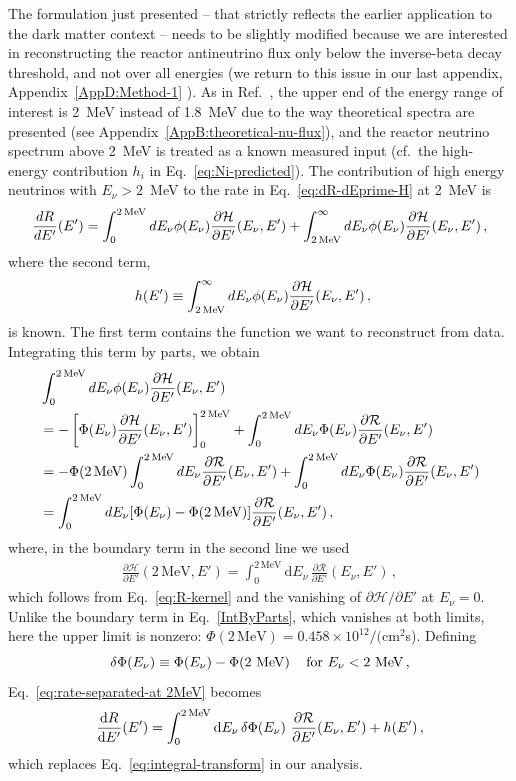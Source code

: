 \documentclass[a4paper,11pt]{article}
\renewcommand\({\left(}
\renewcommand\){\right)}
\renewcommand\[{\left[}
\renewcommand\]{\right]}
\newcommand{\df}{\text{d}}
\newcommand{\al}[1]{\begin{align}#1\end{align}}
\newcommand{\paren}[1]{\left(#1\right)}
\newcommand{\fn}[1]{\!\paren{#1}} %
\newcommand{\nn}{\nonumber\\}
\newcommand{\p}{\partial}
\newcommand{\GG}[1]{{\color[cmyk]{1,0.5,0,0}#1}}%
\theoremstyle{definition}
\newcommand{\ov}{\over}
\newcommand{\mc}{\mathcal}
\newcommand{\pr}{\prime}
\newcommand{\MeV}{\text{MeV}}
\begin{document}
 The formulation just presented -- that strictly reflects the earlier application to the dark matter context -- needs to be slightly modified because we are interested in reconstructing the  reactor antineutrino flux only below the inverse-beta decay threshold, and not over all energies \GG{(we return to this issue in our last appendix,  Appendix~\ref{AppD:Method-1} ).} As in Ref.~\cite{Liao:2023kyy},
the upper end of the energy range of interest is 2~MeV instead of 1.8~MeV due to the way theoretical spectra are presented (see Appendix~\ref{AppB:theoretical-nu-flux}), and the reactor neutrino spectrum above 2~MeV is treated as a known measured input (cf.\ the high-energy contribution $h_i$ in Eq.~\ref{eq:Ni-predicted}).
The contribution of high energy neutrinos with $E_\nu>2$~MeV to the rate in Eq.~\eqref{eq:dR-dEprime-H} at 2~MeV is
\begin{equation} \label{eq:rate-separated-at 2MeV}
    \frac{dR}{dE'}(E')=\int_0^{2\,{\rm MeV}} dE_{\nu}\phi(E_{\nu})\frac{\partial \mathcal{H}}{\partial E'}(E_{\nu},E')+\int_{2\,{\rm MeV}}^\infty dE_{\nu}\phi(E_{\nu})\frac{\partial \mathcal{H}}{\partial E'}(E_{\nu},E')\,,
\end{equation}
where the second term,
\al{ \label{eq:h-definition}
    h\fn{E^\pr} &\equiv \int_{2\,{\rm MeV}}^\infty dE_{\nu}\phi(E_{\nu})\frac{\partial \mathcal{H}}{\partial E'}(E_{\nu},E')\,,
}
is known.
The first term contains the function we want to reconstruct from data.
Integrating this term by parts, we obtain
\al{ \label{int-by-parts-2MeV}
    &\int_0^{2\,{\rm MeV}} dE_{\nu}\phi(E_{\nu})\frac{\partial \mathcal{H}}{\partial E'}(E_{\nu},E')\nn
    &=-\left[ \Phi(E_{\nu})\frac{\partial \mathcal{H}}{\partial E'}(E_{\nu},E') \right]_0^{2\,{\rm MeV}}+\int_0^{2\,{\rm MeV}}dE_{\nu}\Phi(E_{\nu})\frac{\partial \mathcal{R}}{\partial E'}(E_{\nu},E') \\
    &=-\Phi(2\,{\rm MeV})\int_0^{2\,{\rm MeV}}dE_{\nu}\frac{\partial \mathcal{R}}{\partial E'}(E_{\nu},E')+\int_0^{2\,{\rm MeV}}dE_{\nu}\Phi(E_{\nu})\frac{\partial \mathcal{R}}{\partial E'}(E_{\nu},E')\notag\\
    &=\int_0^{2\,{\rm MeV}}dE_{\nu}[\Phi(E_{\nu})-\Phi(2\,{\rm MeV})]\frac{\partial \mathcal{R}}{\partial E'}(E_{\nu},E')\,,\notag
}
where, in the boundary term in the second line we used
\al{
\frac{\partial\mathcal{H}}{\partial E'}(2\,\mathrm{MeV},E') = \int_0^{2\,\mathrm{MeV}} \df E_\nu\, \frac{\partial \mathcal{R}}{\partial E'}(E_{\nu},E')\,, 
}
which follows from Eq.~\eqref{eq:R-kernel} and the vanishing of $\partial\mathcal{H}/\partial E'$ at $E_\nu = 0$.
Unlike the boundary term in Eq.~\eqref{IntByParts}, which vanishes at both limits, here the upper limit is nonzero: $\Phi(2\,\mathrm{MeV})= 0.458 \times 10^{12}/($cm$^2$s). Defining
\begin{equation} 
  \delta\Phi\fn{E_\nu} \equiv \Phi\fn{E_\nu} - \Phi\fn{2~\MeV} \quad {\rm for} \ E_\nu<2\ \rm{MeV}\,,
  \label{eq:deltaphi}
  \end{equation} 
 Eq.~\eqref{eq:rate-separated-at 2MeV} becomes 
\al{
   {\df R\ov \df E^\pr}\fn{E^\pr} = 
   \int_0^{2\,\MeV}\df E_{\nu}\,\delta\Phi\fn{E_{\nu}}\,{\p\mc R\ov \p E^\pr}\fn{E_\nu, E^\pr}+h(E^\pr)\,,
\label{eq:integral-transform-deltaPhi}
}
which replaces Eq.~\eqref{eq:integral-transform} in our analysis.
\end{document}
